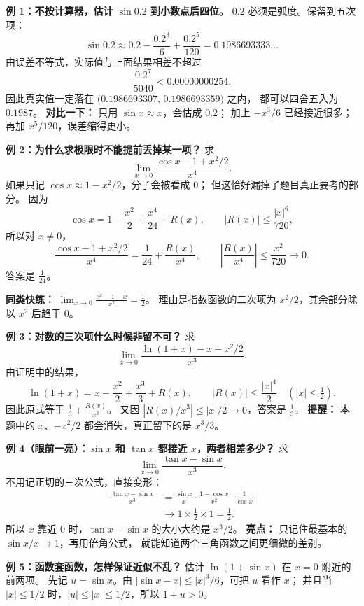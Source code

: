 \clearpage
\begin{examplebox}
\textbf{例 1：不按计算器，估计 $\sin0.2$ 到小数点后四位。}
$0.2$ 必须是弧度。保留到五次项：
\[
 \sin0.2\approx0.2-\frac{0.2^3}{6}+\frac{0.2^5}{120}
 =0.1986693333\ldots
\]
由误差不等式，实际值与上面结果相差不超过
\[
 \frac{0.2^7}{5040}<0.00000000254.
\]
因此真实值一定落在
$\bigl(0.1986693307,\,0.1986693359\bigr)$ 之内，
都可以四舍五入为 $\boxed{0.1987}$。
\textbf{对比一下：} 只用 $\sin x\approx x$，会估成 $0.2$；
加上 $-x^3/6$ 已经接近很多；再加 $x^5/120$，误差缩得更小。


\textbf{例 2：为什么求极限时不能提前丢掉某一项？}
求
\[
 \lim_{x\to0}\frac{\cos x-1+x^2/2}{x^4}.
\]
如果只记 $\cos x\approx1-x^2/2$，分子会被看成 $0$；
但这恰好漏掉了题目真正要考的部分。
因为
\[
 \cos x=1-\frac{x^2}{2}+\frac{x^4}{24}+R(x),\qquad
 |R(x)|\le\frac{|x|^6}{720},
\]
所以对 $x\ne0$，
\[
 \frac{\cos x-1+x^2/2}{x^4}
 =\frac1{24}+\frac{R(x)}{x^4},\qquad
 \left|\frac{R(x)}{x^4}\right|\le\frac{x^2}{720}\to0.
\]
答案是 $\boxed{\frac1{24}}$。

\textbf{同类快练：}
$\displaystyle\lim_{x\to0}\frac{e^x-1-x}{x^2}=\boxed{\frac12}$。
理由是指数函数的二次项为 $x^2/2$，其余部分除以 $x^2$ 后趋于 $0$。

\textbf{例 3：对数的三次项什么时候非留不可？}
求
\[
 \lim_{x\to0}\frac{\ln(1+x)-x+x^2/2}{x^3}.
\]
由证明中的结果，
\[
 \ln(1+x)=x-\frac{x^2}{2}+\frac{x^3}{3}+R(x),
 \qquad |R(x)|\le\frac{|x|^4}{2}\quad(|x|\le\tfrac12).
\]
因此原式等于 $\displaystyle\frac13+\frac{R(x)}{x^3}$。
又因 $|R(x)/x^3|\le|x|/2\to0$，答案是 $\boxed{\frac13}$。
\textbf{提醒：} 本题中的 $x$、$-x^2/2$ 都会消失，真正留下的是 $x^3/3$。

\textbf{例 4（眼前一亮）：$\sin x$ 和 $\tan x$ 都接近 $x$，两者相差多少？}
求
\[
 \lim_{x\to0}\frac{\tan x-\sin x}{x^3}.
\]
不用记正切的三次公式，直接变形：
\[
\begin{aligned}
\frac{\tan x-\sin x}{x^3}
&=\frac{\sin x}{x}\cdot
  \frac{1-\cos x}{x^2}\cdot\frac1{\cos x}\\
&\longrightarrow1\times\frac12\times1
=\boxed{\frac12}.
\end{aligned}
\]
所以 $x$ 靠近 $0$ 时，$\tan x-\sin x$ 的大小大约是 $x^3/2$。
\textbf{亮点：} 只记住最基本的 $\sin x/x\to1$，再用倍角公式，
就能知道两个三角函数之间更细微的差别。

\textbf{例 5：函数套函数，怎样保证近似不乱？}
估计 $\ln(1+\sin x)$ 在 $x=0$ 附近的前两项。
先记 $u=\sin x$。由 $|\sin x-x|\le|x|^3/6$，可把 $u$ 看作 $x$；
并且当 $|x|\le1/2$ 时，$|u|\le|x|\le1/2$，所以 $1+u>0$。


\end{examplebox}
